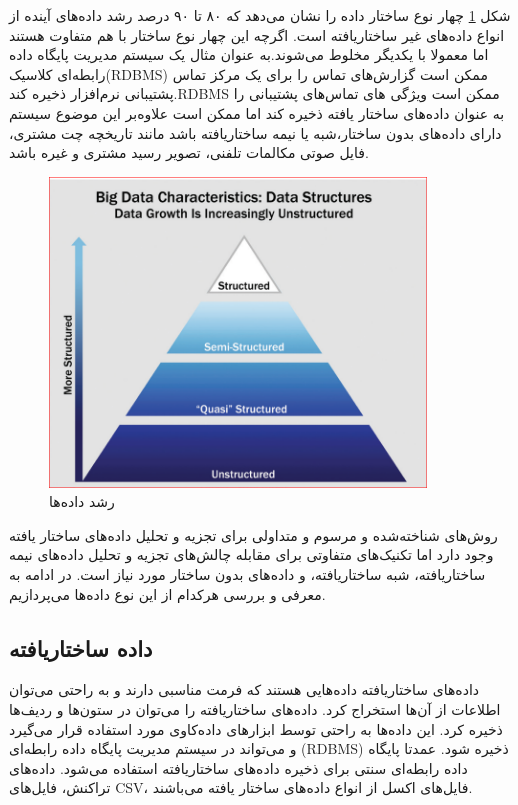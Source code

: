 شکل 
\ref{g_data_structured}
چهار نوع ساختار داده را نشان می‌دهد که ۸۰ تا ۹۰ درصد رشد داده‌های آینده از انواع داده‌های غیر ساختاریافته است. اگرچه این چهار نوع ساختار با هم متفاوت هستند اما معمولا با یکدیگر مخلوط می‌شوند.به عنوان مثال یک سیستم مدیریت پایگاه داده رابطه‌ای کلاسیک(RDBMS) ممکن است گزارش‌های تماس را برای یک مرکز تماس پشتیبانی نرم‌افزار ذخیره کند.RDBMS ممکن است ویژگی های تماس‌های پشتیبانی را به عنوان داده‌های ساختار یافته ذخیره کند اما ممکن است علاوه‌بر این موضوع سیستم دارای داده‌های بدون ساختار،شبه یا نیمه ساختاریافته باشد مانند تاریخچه چت مشتری، فایل صوتی مکالمات تلفنی، تصویر رسید مشتری و غیره باشد.

\begin{figure}[htbp]
\centering
\includegraphics[width=10cm]{data_structured.png}
\caption{رشد داده‌ها}
\label{g_data_structured}
\end{figure}

روش‌های شناخته‌شده و مرسوم و متداولی برای تجزیه و تحلیل داده‌های ساختار یافته وجود دارد اما تکنیک‌های متفاوتی برای مقابله چالش‌های تجزیه و تحلیل داده‌های نیمه ساختار‌یافته، شبه ساختار‌یافته، و داده‌های بدون ساختار مورد نیاز است.
در ادامه به معرفی و بررسی هرکدام از این نوع داده‌ها می‌پردازیم.
\cite{emc2015data}

\subsection{داده ساختار‌یافته}

داده‌های ساختار‌یافته
داده‌هایی هستند که فرمت مناسبی دارند و به راحتی می‌توان اطلاعات از آن‌ها استخراج کرد. داده‌های ساختاریافته را می‌توان در ستون‌ها و ردیف‌ها ذخیره کرد. این داده‌ها به راحتی توسط ابزارهای داده‌کاوی مورد استفاده قرار می‌گیرد و می‌تواند در سیستم مدیریت پایگاه داده رابطه‌ای (RDBMS) ذخیره شود. عمدتا پایگاه داده رابطه‌ای سنتی برای ذخیره داده‌های ساختاریافته استفاده می‌شود. داده‌های تراکنش، فایل‌های CSV، فایل‌های اکسل از انواع داده‌های ساختار یافته می‌باشند.

